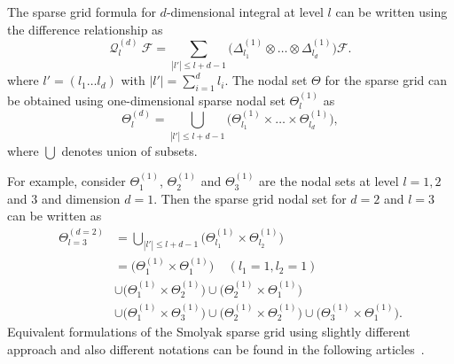 \documentclass[letter,1p,11pt,oneside,onecolumn,sort&compress]{elsarticle}
\begin{document}
The sparse grid formula for $d$-dimensional integral at level $l$ can be written using the difference relationship as~\cite{smith2013uncertainty}
\begin{equation}\label{eq:sgND}
{\mathscr{Q}}_{l}^{(d)} \ {\mathscr{F}} = \sum_{|l'| \leq l+d-1} \Big( {\Delta}_{l_1}^{(1)}  \otimes \dots \otimes {\Delta}_{l_d}^{(1)}  \Big) {\mathscr{F}}.
\end{equation}
where $l'=(l_1 \dots l_d)$ with $|l'| = \sum_{i=1}^d l_i$.
The nodal set $\Theta$ for the sparse grid can be obtained using one-dimensional sparse nodal set $\Theta_{l}^{(1)}$ as~\cite{smith2013uncertainty}
\begin{equation}\label{eq:sgNodes}
\Theta_{l}^{(d)} = \bigcup_{|l'| \leq l+d-1} \Big( \Theta_{l_1}^{(1)}  \times \dots \times \Theta_{l_d}^{(1)}  \Big),
\end{equation}
where $\bigcup$ denotes union of subsets.

For example, consider $\Theta_{1}^{(1)}$, $\Theta_{2}^{(1)}$  and $\Theta_{3}^{(1)}$ are the nodal sets at level $l=1,2$ and $3$ and dimension $d=1$. Then the sparse grid nodal set for $d=2$ and $l=3$ can be written as~\cite{smith2013uncertainty}
\begin{align}
  \Theta_{l=3}^{(d=2)} &= \bigcup_{|l'| \leq l+d-1} \Big( \Theta_{l_1}^{(1)}  \times \Theta_{l_2}^{(1)}  \Big) \\ \nonumber
  &= \Big( \Theta_{1}^{(1)}  \times \Theta_{1}^{(1)}  \Big) \ \ \ \ \ (l_1=1, l_2=1) \\ \nonumber &\cup \Big( \Theta_{1}^{(1)}  \times \Theta_{2}^{(1)}  \Big) \cup \Big( \Theta_{2}^{(1)}  \times \Theta_{1}^{(1)}  \Big) \\ \nonumber
  &\cup \Big( \Theta_{1}^{(1)}  \times \Theta_{3}^{(1)}  \Big)  \cup \Big( \Theta_{2}^{(1)}  \times \Theta_{2}^{(1)}  \Big)  \cup \Big( \Theta_{3}^{(1)}  \times \Theta_{1}^{(1)}  \Big).
\end{align}
Equivalent formulations of the Smolyak sparse grid using slightly different approach and also different notations can be found in the following articles~\cite{eldred2009recent,smith2013uncertainty,le2010spectral}.
\end{document}
